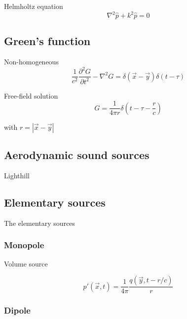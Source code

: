 Helmholtz equation
\begin{equation}\label{eq:theory:sound:wave:helmholtz}
 \nabla^2 \hat{p} + k^2 \hat{p} = 0
\end{equation}
\subsection{Green's function}\label{sec:theory:sound:green}
%
Non-homogeneous
\begin{equation}
\frac{1}{c^2}\frac{\partial^2 G}{\partial t^2} - \nabla^2 G = \delta \left( \vec{x} - \vec{y} \right) \delta \left(t - \tau \right)
\end{equation}

Free-field solution
\begin{equation}
 G = \frac{1}{4 \pi r} \delta \left( t - \tau - \frac{r}{c} \right)
\end{equation}

with $r = \left| \vec{x} - \vec{y} \right|$


\subsection{Aerodynamic sound sources}\label{sec:theory:sound:aerodynamic}
Lighthill


\subsection{Elementary sources}

The elementary sources 


\subsubsection{Monopole}

Volume source
%

\begin{equation}
 p' \left(\vec{x},t\right) = \frac{1}{4\pi} \frac{q \left(\vec{y}, t-r/c\right)}{r}
\end{equation}

\subsubsection{Dipole}

